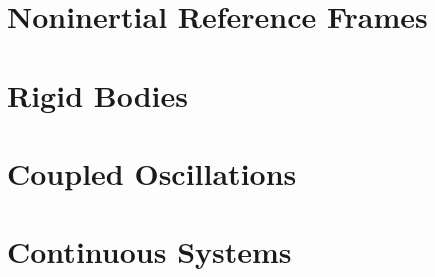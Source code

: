 \section{Noninertial Reference Frames}
\label{sec:cm-noninertial}



\section{Rigid Bodies}
\label{sec:cm-rigid}




\section{Coupled Oscillations}
\label{sec:cm-coupled}

 


\section{Continuous Systems}
\label{sec:cm-continuous}




